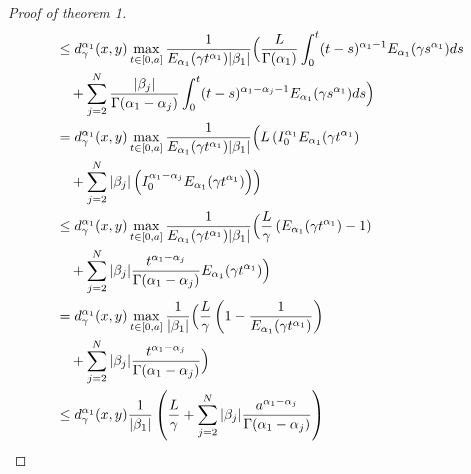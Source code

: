 \documentclass{article}
\begin{document}
\begin{proof}[Proof of theorem 1]
\begin{align*}
			&\leq d_\gamma^{\alpha_1}(x,y) \max_{t \in [0, a]} \frac{1}{E_{\alpha_1}(\gamma t^{\alpha_1})|\beta_1|} \Bigl(
			\frac{L}{\Gamma(\alpha_1)}\int_0^t (t-s)^{\alpha_1 - 1} E_{\alpha_1}(\gamma s^{\alpha_1}) ds \\
			& \ \ \ + \sum_{j=2}^N \frac{|\beta_j|}{\Gamma(\alpha_1 - \alpha_j)} \int_0^t (t-s)^{\alpha_1 - \alpha_j - 1}E_{\alpha_1}(\gamma s^{\alpha_1}) ds \Bigr) \\
			&= d_\gamma^{\alpha_1}(x,y) \max_{t \in [0, a]} \frac{1}{E_{\alpha_1}(\gamma t^{\alpha_1})|\beta_1|} \Bigl(
			L \left( I_{0}^{\alpha_1} E_{\alpha_1}(\gamma t^{\alpha_1} \right) \\
			& \ \ \ + \sum_{j=2}^N |\beta_j| \left( I_{0}^{\alpha_1 - \alpha_j} E_{\alpha_1}(\gamma t^{\alpha_1}) \right) \Bigr) \\
			&\leq d_\gamma^{\alpha_1}(x,y) \max_{t \in [0, a]} \frac{1}{E_{\alpha_1}(\gamma t^{\alpha_1})|\beta_1|} \Bigl(
			\frac{L}{\gamma}\left( E_{\alpha_1}(\gamma t^{\alpha_1}) - 1 \right) \\
			& \ \ \ + \sum_{j=2}^N |\beta_j| \frac{t^{\alpha_1 - \alpha_j}}{\Gamma( \alpha_1 - \alpha_j)} E_{\alpha_1}(\gamma t^{\alpha_1}) \Bigr) \\
			&= d_\gamma^{\alpha_1}(x,y) \max_{t \in [0, a]} \frac{1}{|\beta_1|} \Bigl(
			\frac{L}{\gamma}\left( 1- \frac{1}{E_{\alpha_1}(\gamma t^{\alpha_1})} \right) \\
			& \ \ \ + \sum_{j=2}^N |\beta_j| \frac{t^{\alpha_1 - \alpha_j}}{\Gamma( \alpha_1 - \alpha_j)} \Bigr) \\
			&\leq d_\gamma^{\alpha_1}(x,y) \frac{1}{|\beta_1|}\left( \frac{L}{\gamma} + \sum_{j=2}^N |\beta_j| \frac{a^{\alpha_1 - \alpha_j}}{\Gamma(\alpha_1 - \alpha_j)} \right)
	\end{align*}
\end{proof}
\end{document}
